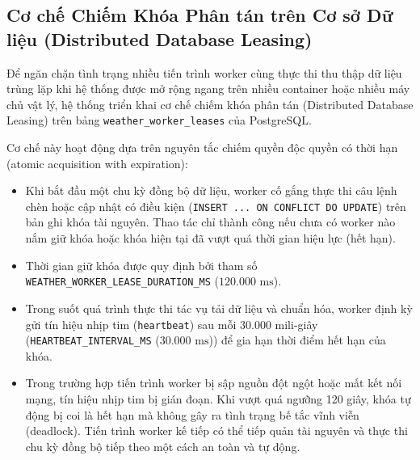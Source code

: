 \subsection{Cơ chế Chiếm Khóa Phân tán trên Cơ sở Dữ liệu (Distributed Database Leasing)}
Để ngăn chặn tình trạng nhiều tiến trình worker cùng thực thi thu thập dữ liệu trùng lặp khi hệ thống được mở rộng ngang trên nhiều container hoặc nhiều máy chủ vật lý, hệ thống triển khai cơ chế chiếm khóa phân tán (Distributed Database Leasing) trên bảng \texttt{weather\_worker\_leases} của PostgreSQL.

Cơ chế này hoạt động dựa trên nguyên tắc chiếm quyền độc quyền có thời hạn (atomic acquisition with expiration):
\begin{itemize}
    \item[-] Khi bắt đầu một chu kỳ đồng bộ dữ liệu, worker cố gắng thực thi câu lệnh chèn hoặc cập nhật có điều kiện (\texttt{INSERT ... ON CONFLICT DO UPDATE}) trên bản ghi khóa tài nguyên. Thao tác chỉ thành công nếu chưa có worker nào nắm giữ khóa hoặc khóa hiện tại đã vượt quá thời gian hiệu lực (hết hạn).
    \item[-] Thời gian giữ khóa được quy định bởi tham số \texttt{WEATHER\_}\allowbreak\texttt{WORKER\_}\allowbreak\texttt{LEASE\_}\allowbreak\texttt{DURATION\_MS} ($120.000\text{ ms}$).
    \item[-] Trong suốt quá trình thực thi tác vụ tải dữ liệu và chuẩn hóa, worker định kỳ gửi tín hiệu nhịp tim (\texttt{heartbeat}) sau mỗi 30.000 mili-giây (\texttt{HEARTBEAT\_INTERVAL\_MS} ($30.000\text{ ms}$)) để gia hạn thời điểm hết hạn của khóa.
    \item[-] Trong trường hợp tiến trình worker bị sập nguồn đột ngột hoặc mất kết nối mạng, tín hiệu nhịp tim bị gián đoạn. Khi vượt quá ngưỡng 120 giây, khóa tự động bị coi là hết hạn mà không gây ra tình trạng bế tắc vĩnh viễn (deadlock). Tiến trình worker kế tiếp có thể tiếp quản tài nguyên và thực thi chu kỳ đồng bộ tiếp theo một cách an toàn và tự động.
\end{itemize}

